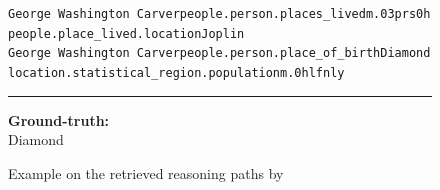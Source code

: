 \begin{figure}[t]
\begin{tcolorbox}[colback=gray!5!white,
                  colframe=gray!75!black,
                  title=WEBQSP-WebQTest-7]
{\texttt{George Washington Carver\patharrow people.person.places\_lived\patharrow m.03prs0h\patharrow \\ people.place\_lived.location\patharrow Joplin}\\[6pt]

\texttt{George Washington Carver\patharrow people.person.place\_of\_birth\patharrow Diamond\patharrow \\ location.statistical\_region.population\patharrow m.0hlfnly}\\[6pt]

\par}

\rule{\linewidth}{0.4pt}

\textbf{Ground-truth:}\\
Diamond

\end{tcolorbox}
\caption{Example on the retrieved reasoning paths by \proj}
\label{fig:example1}
\end{figure}


